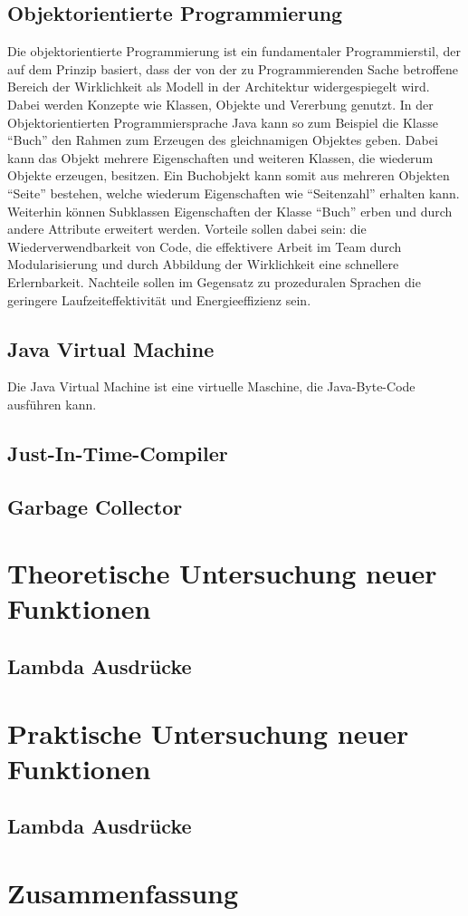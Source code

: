 \section{Objektorientierte Programmierung}
\label{sec:OO}
Die objektorientierte Programmierung ist ein fundamentaler Programmierstil, der
auf dem Prinzip basiert, dass der von der zu Programmierenden Sache betroffene
Bereich der Wirklichkeit als Modell in der Architektur widergespiegelt wird.
Dabei werden Konzepte wie Klassen, Objekte und Vererbung genutzt.
In der Objektorientierten Programmiersprache Java kann so zum Beispiel die
Klasse "`Buch"' den Rahmen zum Erzeugen des gleichnamigen Objektes geben. Dabei
kann das Objekt mehrere Eigenschaften und weiteren Klassen, die
wiederum Objekte erzeugen, besitzen. Ein Buchobjekt kann somit aus mehreren
Objekten "`Seite"' bestehen, welche wiederum Eigenschaften wie "`Seitenzahl"'
erhalten kann. Weiterhin können Subklassen Eigenschaften der Klasse "`Buch"'
erben und durch andere Attribute erweitert werden.
Vorteile sollen dabei sein: die Wiederverwendbarkeit von Code, die effektivere
Arbeit im Team durch Modularisierung und durch Abbildung der Wirklichkeit eine
schnellere Erlernbarkeit. Nachteile sollen im Gegensatz zu prozeduralen Sprachen
die geringere Laufzeiteffektivität und Energieeffizienz sein.

\section{Java Virtual Machine}
\label{sec:JVM}
Die Java Virtual Machine ist eine virtuelle Maschine, die Java-Byte-Code
ausführen kann.

\section{Just-In-Time-Compiler}
\label{sec:JIT}


\section{Garbage Collector}
\label{sec:GC}


\chapter{Theoretische Untersuchung neuer Funktionen}
\label{sec:Theorie}

\section{Lambda Ausdrücke}
\label{sec:Lambda}

\chapter{Praktische Untersuchung neuer Funktionen}
\label{sec:Praxis}

\section{Lambda Ausdrücke}
\label{sec:Lambda}

\chapter{Zusammenfassung}
\label{sec:Fazit}